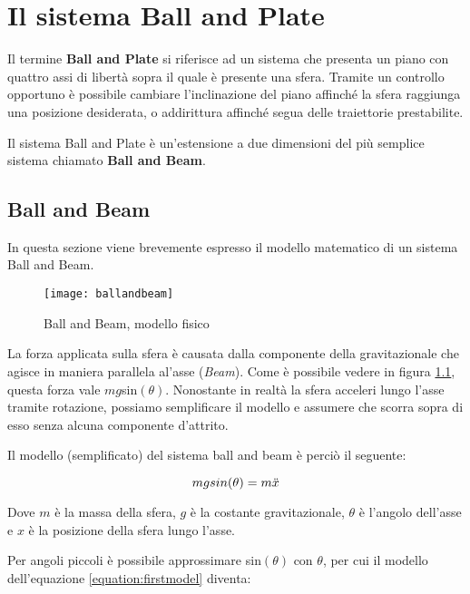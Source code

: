 \chapter{Il sistema Ball and Plate}
\label{chapter:ballandplate}

Il termine \textbf{Ball and Plate} si riferisce ad un sistema che presenta un piano con quattro assi di libertà sopra il quale è presente una sfera. Tramite un controllo opportuno è possibile cambiare l'inclinazione del piano affinché la sfera raggiunga una posizione desiderata, o addirittura affinché segua delle traiettorie prestabilite.

Il sistema Ball and Plate è un'estensione a due dimensioni del più semplice sistema chiamato \textbf{Ball and Beam}.

\section{Ball and Beam}

In questa sezione viene brevemente espresso il modello matematico di un sistema Ball and Beam\cite{ballandbeam}.

\bigskip

\begin{figure}[ht]

	\centering
	\texttt{[image: ballandbeam]}
	\caption{Ball and Beam, modello fisico}
	\label{fig:ballandbeam}
\end{figure}

La forza applicata sulla sfera è causata dalla componente della gravitazionale che agisce in maniera parallela al'asse (\textit{Beam}). Come è possibile vedere in figura \ref{fig:ballandbeam}, questa forza vale $mg$sin$(\theta)$. Nonostante in realtà la sfera acceleri lungo l'asse tramite rotazione, possiamo semplificare il modello e assumere che scorra sopra di esso senza alcuna componente d'attrito. 

Il modello (semplificato) del sistema ball and beam è perciò il seguente:

\begin{equation}
	\centering
	mgsin(\theta) = m\ddot{x}
	\label{equation:firstmodel}
\end{equation}

Dove $m$ è la massa della sfera, $g$ è la costante gravitazionale, $\theta$ è l'angolo dell'asse e $x$ è la posizione della sfera lungo l'asse.

Per angoli piccoli è possibile approssimare sin$(\theta)$ con $\theta$, per cui il modello dell'equazione \ref{equation:firstmodel} diventa:

